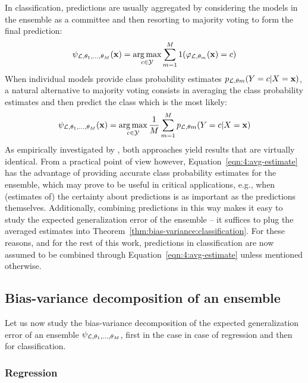 In classification, predictions are usually aggregated by considering the
models in the ensemble as a committee  and then resorting to majority voting to
form the final prediction:
\begin{equation}
\psi_{{\cal L},\theta_1,\dots,\theta_M}(\mathbf{x}) = \operatorname*{arg\,max}_{c \in {\cal Y}}  \sum_{m=1}^M 1(\varphi_{{\cal L},\theta_m}(\mathbf{x})=c)
\end{equation}
When individual models provide class probability estimates $p_{{\cal L},\theta m}(Y=c|X=\mathbf{x})$,
a natural alternative to majority voting consists in averaging the class probability estimates
and then predict the class which is the most likely:
\begin{equation}\label{eqn:4:avg-estimate}
\psi_{{\cal L},\theta_1,\dots,\theta_M}(\mathbf{x}) = \operatorname*{arg\,max}_{c \in {\cal Y}} \frac{1}{M} \sum_{m=1}^M p_{{\cal L},\theta m}(Y=c|X=\mathbf{x})
\end{equation}
As empirically investigated by \citet{breiman:1996b}, both approaches yield
results that are virtually identical. From a practical point of view however,
Equation~\ref{eqn:4:avg-estimate} has the advantage of providing accurate class
probability estimates for the ensemble, which may prove to be useful in
critical applications, e.g., when (estimates of) the certainty about
predictions is as important as the predictions themselves. Additionally,
combining predictions in this way makes it easy to study the expected
generalization error of the ensemble -- it suffices to plug the averaged
estimates into Theorem~\ref{thm:bias-variance:classification}. For these
reasons, and for the rest of this work, predictions in classification are now
assumed to be combined through Equation~\ref{eqn:4:avg-estimate} unless
mentioned otherwise.


\subsection{Bias-variance decomposition of an ensemble}
\label{sec:4:bias-variance:ensemble}

Let us now study the bias-variance decomposition of the expected generalization
error of an ensemble $\psi_{{\cal L},\theta_1,\dots,\theta_M}$, first in the
case in case of regression and then for classification.

\subsubsection{Regression}


